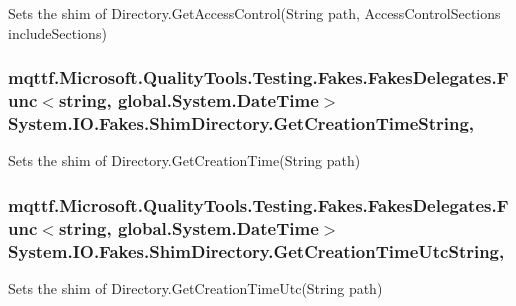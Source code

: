 Sets the shim of Directory.\-Get\-Access\-Control(\-String path, Access\-Control\-Sections include\-Sections)

\hypertarget{class_system_1_1_i_o_1_1_fakes_1_1_shim_directory_a0b55deab30bd15f5c48837772a19d12c}{
\subsubsection[{Get\-Creation\-Time\-String}]{\setlength{\rightskip}{0pt plus 5cm}mqttf.\-Microsoft.\-Quality\-Tools.\-Testing.\-Fakes.\-Fakes\-Delegates.\-Func$<$string, global.\-System.\-Date\-Time$>$ System.\-I\-O.\-Fakes.\-Shim\-Directory.\-Get\-Creation\-Time\-String\hspace{0.3cm}{\ttfamily [static]}, {\ttfamily [set]}}}\label{class_system_1_1_i_o_1_1_fakes_1_1_shim_directory_a0b55deab30bd15f5c48837772a19d12c}


Sets the shim of Directory.\-Get\-Creation\-Time(\-String path)

\hypertarget{class_system_1_1_i_o_1_1_fakes_1_1_shim_directory_a8f03ae60493732d5217e12d1904c275c}{
\subsubsection[{Get\-Creation\-Time\-Utc\-String}]{\setlength{\rightskip}{0pt plus 5cm}mqttf.\-Microsoft.\-Quality\-Tools.\-Testing.\-Fakes.\-Fakes\-Delegates.\-Func$<$string, global.\-System.\-Date\-Time$>$ System.\-I\-O.\-Fakes.\-Shim\-Directory.\-Get\-Creation\-Time\-Utc\-String\hspace{0.3cm}{\ttfamily [static]}, {\ttfamily [set]}}}\label{class_system_1_1_i_o_1_1_fakes_1_1_shim_directory_a8f03ae60493732d5217e12d1904c275c}


Sets the shim of Directory.\-Get\-Creation\-Time\-Utc(\-String path)


